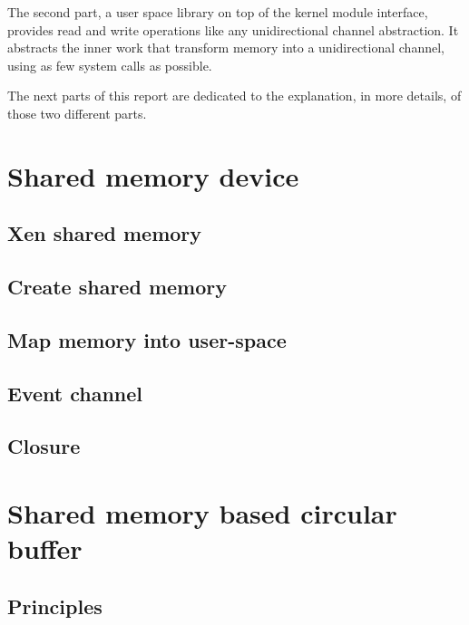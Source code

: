 \documentclass[journal]{IEEEtran}
\begin{document}
The second part, a user space library on top of the kernel module interface, provides read and write operations like any unidirectional channel abstraction. It abstracts the inner work that transform memory into a unidirectional channel, using as few system calls as possible.

The next parts of this report are dedicated to the explanation, in more details, of those two different parts.

\section{Shared memory device}

\subsection{Xen shared memory}



\subsection{Create shared memory}



\subsection{Map memory into user-space}



\subsection{Event channel}



\subsection{Closure}









\section{Shared memory based circular buffer}

\subsection{Principles}
\end{document}
